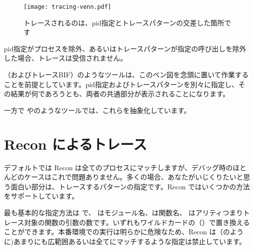 \begin{figure}[H]
  \texttt{[image: tracing-venn.pdf]}%
  \centering%
  \caption{トレースされるのは、pid指定とトレースパターンの交差した箇所です}%
   \label{fig:tracing-venn}
\end{figure}

pid指定がプロセスを除外、あるいはトレースパターンが指定の呼び出しを除外した場合、トレースは受信されません。

（およびトレースBIF）のようなツールは、このベン図を念頭に置いて作業することを前提としています。pid指定およびトレースパターンを別々に指定し、その結果が何であろうとも、両者の共通部分が表示されることになります。

一方で やのようなツールでは、これらを抽象化しています。

\section{Recon によるトレース}

デフォルトでは Recon は全てのプロセスにマッチしますが、デバッグ時のほとんどのケースはこれで問題ありません。多くの場合、あなたがいじくりたいと思う面白い部分は、トレースするパターンの指定です。Recon ではいくつかの方法をサポートしています。

最も基本的な指定方法は で、 はモジュール名、は関数名、 はアリティつまりトレース対象の関数の引数の数です。いずれもワイルドカードの（）で置き換えることができます。本番環境での実行は明らかに危険なため、Recon は（のように)あまりにも広範囲あるいは全てにマッチするような指定は禁止しています。

